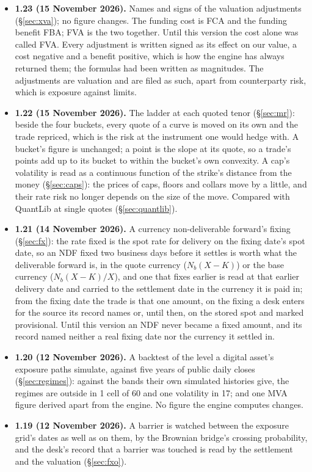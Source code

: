 \documentclass[11pt,a4paper]{article}
\begin{document}
{\begin{itemize}[leftmargin=1.4em, itemsep=4pt]
\item \textbf{1.23 (15 November 2026).} Names and signs of the valuation adjustments (\S\ref{sec:xva}); no figure changes. The funding cost is FCA and the funding benefit FBA; FVA is the two together. Until this version the cost alone was called FVA. Every adjustment is written signed as its effect on our value, a cost negative and a benefit positive, which is how the engine has always returned them; the formulas had been written as magnitudes. The adjustments are valuation and are filed as such, apart from counterparty risk, which is exposure against limits.
\item \textbf{1.22 (15 November 2026).} The ladder at each quoted tenor (\S\ref{sec:mr}): beside the four buckets, every quote of a curve is moved on its own and the trade repriced, which is the risk at the instrument one would hedge with. A bucket's figure is unchanged; a point is the slope at its quote, so a trade's points add up to its bucket to within the bucket's own convexity. A cap's volatility is read as a continuous function of the strike's distance from the money (\S\ref{sec:caps}): the prices of caps, floors and collars move by a little, and their rate risk no longer depends on the size of the move. Compared with QuantLib at single quotes (\S\ref{sec:quantlib}).
\item \textbf{1.21 (14 November 2026).} A currency non-deliverable forward's fixing (\S\ref{sec:fx}): the rate fixed is the spot rate for delivery on the fixing date's spot date, so an NDF fixed two business days before it settles is worth what the deliverable forward is, in the quote currency ($N_b(X-K)$) or the base currency ($N_b(X-K)/X$), and one that fixes earlier is read at that earlier delivery date and carried to the settlement date in the currency it is paid in; from the fixing date the trade is that one amount, on the fixing a desk enters for the source its record names or, until then, on the stored spot and marked provisional. Until this version an NDF never became a fixed amount, and its record named neither a real fixing date nor the currency it settled in.
\item \textbf{1.20 (12 November 2026).} A backtest of the level a digital asset's exposure paths simulate, against five years of public daily closes (\S\ref{sec:regimes}): against the bands their own simulated histories give, the regimes are outside in 1 cell of 60 and one volatility in 17; and one MVA figure derived apart from the engine. No figure the engine computes changes.
\item \textbf{1.19 (12 November 2026).} A barrier is watched between the exposure grid's dates as well as on them, by the Brownian bridge's crossing probability, and the desk's record that a barrier was touched is read by the settlement and the valuation (\S\ref{sec:fxo}).

\end{itemize}}
\end{document}
